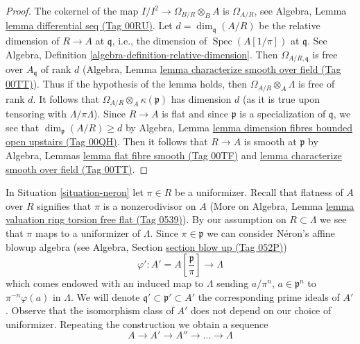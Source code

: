 \documentclass{amsart}
\theoremstyle{plain}
\theoremstyle{definition}
\theoremstyle{remark}
\numberwithin{equation}{subsection}
\def\Spec{\mathop{\mathrm{Spec}}}
\begin{document}
\begin{proof}
The cokernel of the map $I/I^2 \to \Omega_{B/R} \otimes_B A$
is $\Omega_{A/R}$, see Algebra, Lemma \href{https://stacks.math.columbia.edu/tag/00RU}{lemma differential seq (Tag 00RU)}.
Let $d = \dim_\mathfrak q(A/R)$ be the relative dimension of $R \to A$
at $\mathfrak q$, i.e., the dimension of $\Spec(A[1/\pi])$ at $\mathfrak q$.
See Algebra, Definition \ref{algebra-definition-relative-dimension}.
Then $\Omega_{A/R, \mathfrak q}$ is free over $A_\mathfrak q$ of rank $d$
(Algebra, Lemma \href{https://stacks.math.columbia.edu/tag/00TT}{lemma characterize smooth over field (Tag 00TT)}).
Thus if the hypothesis of the lemma holds,
then $\Omega_{A/R} \otimes_A \Lambda$ is free of rank $d$.
It follows that $\Omega_{A/R} \otimes_A \kappa(\mathfrak p)$
has dimension $d$ (as it is true upon tensoring with $\Lambda/\pi \Lambda$).
Since $R \to A$ is flat and since $\mathfrak p$
is a specialization of $\mathfrak q$, we see that
$\dim_\mathfrak p(A/R) \geq d$ by Algebra, Lemma
\href{https://stacks.math.columbia.edu/tag/00QH}{lemma dimension fibres bounded open upstairs (Tag 00QH)}.
Then it follows that $R \to A$ is smooth at $\mathfrak p$ by
Algebra, Lemmas \href{https://stacks.math.columbia.edu/tag/00TF}{lemma flat fibre smooth (Tag 00TF)} and
\href{https://stacks.math.columbia.edu/tag/00TT}{lemma characterize smooth over field (Tag 00TT)}.
\end{proof}


\noindent
In Situation \ref{situation-neron} let $\pi \in R$ be a uniformizer.
Recall that flatness of $A$ over $R$ signifies that $\pi$
is a nonzerodivisor on $A$
(More on Algebra, Lemma
\href{https://stacks.math.columbia.edu/tag/0539}{lemma valuation ring torsion free flat (Tag 0539)}).
By our assumption on $R \subset \Lambda$ we see that $\pi$ maps
to a uniformizer of $\Lambda$. Since $\pi \in \mathfrak p$ we can consider
N\'eron's affine blowup algebra (see
Algebra, Section \href{https://stacks.math.columbia.edu/tag/052P}{section blow up (Tag 052P)})
$$
\varphi' :
A' = A[\textstyle{\frac{\mathfrak p}{\pi}}]
\longrightarrow
\Lambda
$$
which comes endowed with an induced map to $\Lambda$ sending
$a/\pi^n$, $a \in \mathfrak p^n$ to $\pi^{-n}\varphi(a)$ in $\Lambda$.
We will denote $\mathfrak q' \subset \mathfrak p' \subset A'$
the corresponding prime ideals of $A'$. Observe that the isomorphism
class of $A'$ does not depend on our choice of uniformizer.
Repeating the construction we obtain a sequence
$$
A \to A' \to A'' \to \ldots \to \Lambda
$$
\end{document}
